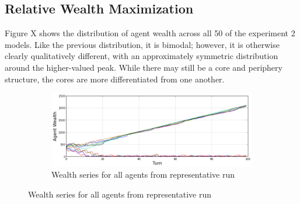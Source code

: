 \documentclass{article}
\begin{document}
\subsection{Relative Wealth Maximization}

Figure X shows the distribution of agent wealth across all 50 of the experiment 2 models. Like the previous distribution, it is bimodal; however, it is otherwise clearly qualitatively different, with an approximately symmetric distribution around the higher-valued peak. While there may still be a core and periphery structure, the cores are more differentiated from one another.

\begin{figure}[h!]
	\centering
	\begin{subfigure}{\textwidth}
		\includegraphics[width=\textwidth]{Graphics/Exp2SampleRun}
		\caption{Wealth series for all agents from representative run}
	\end{subfigure}



\end{figure}
\end{document}
